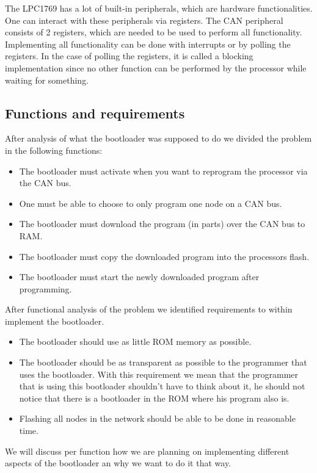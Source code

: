 \documentclass[twocolumn]{article}
\begin{document}
		The LPC1769 has a lot of built-in peripherals,
		which are hardware functionalities.
		One can interact with these peripherals via registers.
		The CAN peripheral consists of 2 registers, which are needed to be used to perform all functionality.
		Implementing all functionality can be done with interrupts or by polling the registers.
		In the case of polling the registers, it is called a blocking implementation since no other function can be performed by the processor while waiting for something.
	
	\subsection*{Functions and requirements}
		After analysis of what the bootloader was supposed to do we divided the problem in the following functions:
		\begin{itemize}
			\item The bootloader must activate when you want to reprogram the processor via the CAN bus.
			\item One must be able to choose to only program one node on a CAN bus.
			\item The bootloader must download the program (in parts) over the CAN bus to RAM.
			\item The bootloader must copy the downloaded program into the processors flash.
			\item The bootloader must start the newly downloaded program after programming.
		\end{itemize}
		After functional analysis of the problem we identified requirements to within implement the bootloader.
		\begin{itemize}
			\item The bootloader should use as little ROM memory as possible.
			\item The bootloader should be as transparent as possible to the programmer that uses the bootloader. With this requirement we mean that the programmer that is using this bootloader shouldn't have to think about it, he should not notice that there is a bootloader in the ROM where his program also is.
			\item Flashing all nodes in the network should be able to be done in reasonable time.
		\end{itemize}
		
		We will discuss per function how we are planning on implementing different aspects of the bootloader an why we want to do it that way.
	
\end{document}
